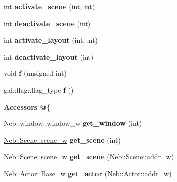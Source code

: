 \begin{DoxyCompactItemize}
\item 
\hypertarget{classNeb_1_1app_aa558ff3c281cd6f6b7bdca7f5a7807ff}{int {\bfseries activate\-\_\-scene} (int, int)}\label{classNeb_1_1app_aa558ff3c281cd6f6b7bdca7f5a7807ff}

\item 
\hypertarget{classNeb_1_1app_a5b1a2bc9d50490f9fce6edf33a910ad5}{int {\bfseries deactivate\-\_\-scene} (int)}\label{classNeb_1_1app_a5b1a2bc9d50490f9fce6edf33a910ad5}

\item 
\hypertarget{classNeb_1_1app_a421f2d98f0857f6d73824740019c94f1}{int {\bfseries activate\-\_\-layout} (int, int)}\label{classNeb_1_1app_a421f2d98f0857f6d73824740019c94f1}

\item 
\hypertarget{classNeb_1_1app_a81e36552d5b9bd439237b8ca7950f82b}{int {\bfseries deactivate\-\_\-layout} (int)}\label{classNeb_1_1app_a81e36552d5b9bd439237b8ca7950f82b}

\item 
\hypertarget{classNeb_1_1app_a373ce82cfb06b21444d90daeaa0900a5}{void {\bfseries f} (unsigned int)}\label{classNeb_1_1app_a373ce82cfb06b21444d90daeaa0900a5}

\item 
\hypertarget{classNeb_1_1app_a4158adddede1a017c151da072503dcad}{gal\-::flag\-::flag\-\_\-type {\bfseries f} ()}\label{classNeb_1_1app_a4158adddede1a017c151da072503dcad}

\end{DoxyCompactItemize}
\begin{Indent}{\bf \-Accessors @\{}\par
\begin{DoxyCompactItemize}
\item 
\hypertarget{classNeb_1_1app_a9e1237d528a0bfd338526751bff4a60d}{\-Neb\-::window\-::window\-\_\-w {\bfseries get\-\_\-window} (int)}\label{classNeb_1_1app_a9e1237d528a0bfd338526751bff4a60d}

\item 
\hypertarget{classNeb_1_1app_af34dfea535edde96fc5e5dfb67c37505}{\hyperlink{classNeb_1_1weak__ptr}{\-Neb\-::\-Scene\-::scene\-\_\-w} {\bfseries get\-\_\-scene} (int)}\label{classNeb_1_1app_af34dfea535edde96fc5e5dfb67c37505}

\item 
\hypertarget{classNeb_1_1app_ae37a92e33de6acf1fd0c338300862ca8}{\hyperlink{classNeb_1_1weak__ptr}{\-Neb\-::\-Scene\-::scene\-\_\-w} {\bfseries get\-\_\-scene} (\hyperlink{classNeb_1_1weak__ptr}{\-Neb\-::\-Scene\-::addr\-\_\-w})}\label{classNeb_1_1app_ae37a92e33de6acf1fd0c338300862ca8}

\item 
\hypertarget{classNeb_1_1app_a22284f20ae70f616792bceef3fa15bfe}{\hyperlink{classNeb_1_1weak__ptr}{\-Neb\-::\-Actor\-::\-Base\-\_\-w} {\bfseries get\-\_\-actor} (\hyperlink{classNeb_1_1weak__ptr}{\-Neb\-::\-Actor\-::addr\-\_\-w})}\label{classNeb_1_1app_a22284f20ae70f616792bceef3fa15bfe}

\end{DoxyCompactItemize}
\end{Indent}
